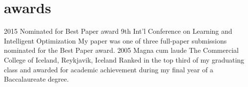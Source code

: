 \section{awards}
\begin{entrylist}
\entry
{2015}
{Nominated for Best Paper award}
{9th Int'l Conference on Learning and Intelligent Optimization}
{My paper  was one of three full-paper submissions nominated for the Best Paper award.}
\entry
{2005}
{Magna cum laude}
{The Commercial College of Iceland, Reykjavik, Iceland}
{Ranked in the top third of my graduating class and awarded for academic achievement during my final year of a Baccalaureate degree.}
\end{entrylist}
